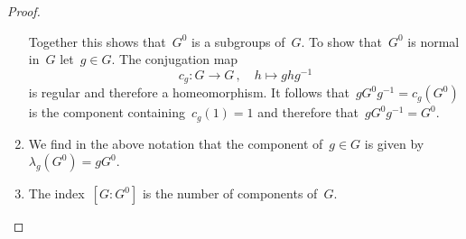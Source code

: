 \begin{proof}
\begin{enumerate}
      Together this shows that~$G^0$ is a subgroups of~$G$.
      To show that~$G^0$ is normal in~$G$ let~$g \in G$.
      The conjugation map
      \[
                c_g
        \colon  G
        \to     G \,,
        \quad   h
        \mapsto g h g^{-1}
      \]
      is regular and therefore a homeomorphism.
      It follows that~$g G^0 g^{-1} = c_g(G^0)$ is the component containing~$c_g(1) = 1$ and therefore that~$g G^0 g^{-1} = G^0$.
    \item
      We find in the above notation that the component of~$g \in G$ is given by~$\lambda_g( G^0 ) = g G^0$.
    \item
      The index~$[G : G^0]$ is the number of components of~$G$.
    \qedhere
  \end{enumerate}
\end{proof}




